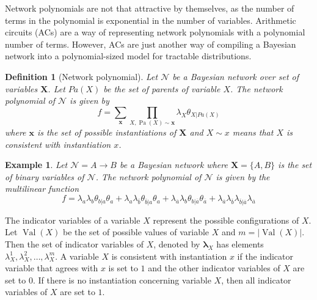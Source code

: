 \documentclass{amsart}
\DeclareMathOperator*{\Val}{\text{Val}}
\DeclareMathOperator*{\Pa}{\text{Pa}}
\newcommand{\ov}{\overline}
\theoremstyle{plain}
\newcounter{dummy-def}\numberwithin{dummy-def}{section}
\newtheorem{definition}[dummy-def]{Definition}
\newcounter{dummy-thm}\numberwithin{dummy-thm}{section}
\newcounter{dummy-prop}\numberwithin{dummy-prop}{section}
\newcounter{dummy-corollary}\numberwithin{dummy-corollary}{section}
\newcounter{dummy-ex}\numberwithin{dummy-ex}{section}
\newcounter{dummy-eg}\numberwithin{dummy-eg}{section}
\newtheorem{example}[dummy-eg]{Example}
\numberwithin{equation}{section}
\begin{document}
Network polynomials are not that attractive by themselves, as the number of terms in the polynomial
is exponential in the number of variables. Arithmetic circuits (ACs) are a way of representing
network polynomials with a polynomial number of terms. However, ACs are just another way of
compiling a Bayesian network into a polynomial-sized model for tractable distributions.

\begin{definition}[Network polynomial] Let $\mathcal{N}$ be a Bayesian network over set of
  variables $\mathbf{X}$. Let $Pa(X)$ be the set of parents of variable $X$. The network polynomial
  of $\mathcal{N}$ is given by
  \begin{equation*}
    f=\sum_{\mathbf{x}} \prod_{X, \Pa(X) \sim \mathbf{x}} \lambda_X \theta_{X|Pa(X)}
  \end{equation*}
  where $\mathbf{x}$ is the set of possible instantiations of $\mathbf{X}$ and $X \sim x$ means
  that $X$ is consistent with instantiation $x$.
\end{definition}

\begin{example}
  Let $\mathcal{N}=A\to B$ be a Bayesian network where $\mathbf{X}=\{A, B\}$ is the set of binary
  variables of $\mathcal{N}$. The network polynomial of $\mathcal{N}$ is given by the multilinear
  function
  \begin{equation*}
    f=\lambda_a\lambda_b\theta_{b|a}\theta_{a}+\lambda_a\lambda_{\ov{b}}\theta_{\ov{b}|a}\theta_a+
    \lambda_{\ov{a}}\lambda_b\theta_{b|\ov{a}}\theta_{\ov{a}}+\lambda_{\ov{a}}\lambda_{\ov{b}}
    \lambda_{\ov{b}|\ov{a}}\lambda_{\ov{a}}
  \end{equation*}
\end{example}

The indicator variables of a variable $X$ represent the possible configurations of $X$. Let
$\Val(X)$ be the set of possible values of variable $X$ and $m=|\Val(X)|$. Then the set of
indicator variables of $X$, denoted by $\boldsymbol{\lambda}_X$ has elements $\lambda_X^1,
\lambda_X^2,\ldots,\lambda_X^m$. A variable $X$ is consistent with instantiation $x$ if the
indicator variable that agrees with $x$ is set to $1$ and the other indicator variables of $X$ are
set to $0$. If there is no instantiation concerning variable $X$, then all indicator variables of
$X$ are set to $1$.
\end{document}
